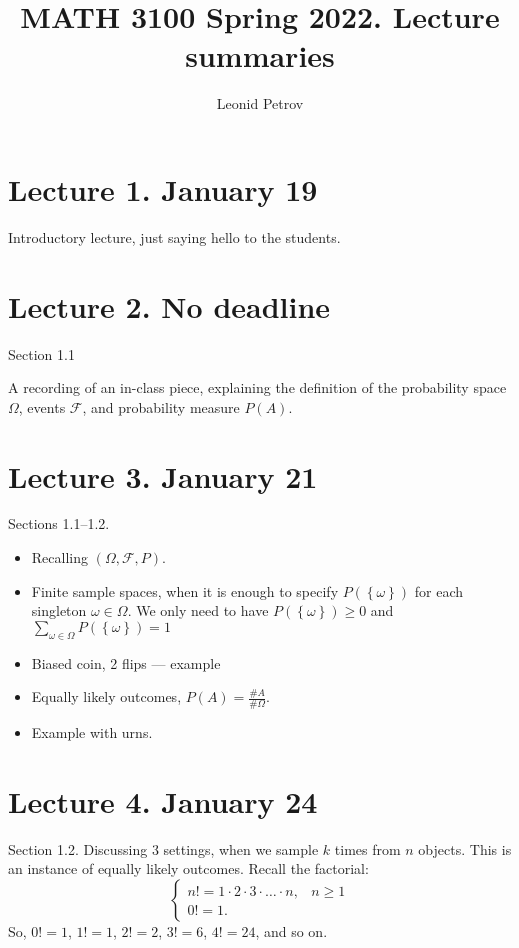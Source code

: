 \documentclass[letterpaper,11pt,oneside,reqno]{amsart}
\numberwithin{equation}{section}
\theoremstyle{definition}
\begin{document}
\title{MATH 3100 Spring 2022. Lecture summaries}


\author{Leonid Petrov}

\date{}

\maketitle

\section*{Lecture 1. January 19}

Introductory lecture, just saying hello to the students.

\section*{Lecture 2. No deadline}

Section 1.1

A recording of an in-class piece, explaining 
the definition of the
probability space $\Omega$, events $\mathcal{F}$, 
and probability measure $P(A)$.

\section*{Lecture 3. January 21}

Sections 1.1--1.2.

\begin{itemize}
	\item 
Recalling $(\Omega,\mathcal{F},P)$. 
\item 
Finite sample spaces, when it is 
enough to specify $P(\left\{ \omega \right\})$ for each singleton $\omega\in \Omega$.
We only need to have $P(\left\{ \omega \right\})\ge0$ and $\sum_{\omega\in \Omega}P\left( \left\{ \omega \right\} \right)=1$
\item Biased coin, 2 flips --- example
\item Equally likely outcomes, $P(A)=\frac{\# A}{\#\Omega}$. 
\item Example with urns.
\end{itemize}

\section*{Lecture 4. January 24}

Section 1.2. Discussing 3 settings,
when we sample $k$ times from $n$ objects. This is an instance of equally likely
outcomes.
Recall the factorial:
\begin{equation*}
	\begin{cases}
		n!=1\cdot 2\cdot 3\cdot \ldots\cdot n,&n\ge1 
		\\
		0!=1.
	\end{cases}
\end{equation*}
So, $0!=1$, $1!=1$, $2!=2$, $3!=6$, $4!=24$, and so on.
\end{document}
